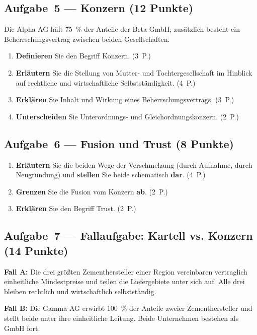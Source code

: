 \documentclass[11pt, a4paper]{article}
\begin{document}
\subsection*{Aufgabe~5 --- Konzern (12 Punkte)}

Die Alpha AG hält 75~\% der Anteile der Beta GmbH; zusätzlich besteht ein
Beherrschungsvertrag zwischen beiden Gesellschaften.

\begin{enumerate}[label=(\alph*)]
  \item \textbf{Definieren} Sie den Begriff Konzern. \hfill (3~P.)
  \item \textbf{Erläutern} Sie die Stellung von Mutter- und Tochtergesellschaft im
    Hinblick auf rechtliche und wirtschaftliche Selbstständigkeit. \hfill (4~P.)
  \item \textbf{Erklären} Sie Inhalt und Wirkung eines Beherrschungsvertrags. \hfill (3~P.)
  \item \textbf{Unterscheiden} Sie Unterordnungs- und Gleichordnungskonzern. \hfill (2~P.)
\end{enumerate}

\subsection*{Aufgabe~6 --- Fusion und Trust (8 Punkte)}

\begin{enumerate}[label=(\alph*)]
  \item \textbf{Erläutern} Sie die beiden Wege der Verschmelzung (durch Aufnahme, durch
    Neugründung) und \textbf{stellen} Sie beide schematisch \textbf{dar}. \hfill (4~P.)
  \item \textbf{Grenzen} Sie die Fusion vom Konzern \textbf{ab}. \hfill (2~P.)
  \item \textbf{Erklären} Sie den Begriff Trust. \hfill (2~P.)
\end{enumerate}

\subsection*{Aufgabe~7 --- Fallaufgabe: Kartell vs. Konzern (14 Punkte)}

\begin{beispiel}[title={Ausgangssituation}]
\textbf{Fall A:} Die drei größten Zementhersteller einer Region vereinbaren vertraglich
einheitliche Mindestpreise und teilen die Liefergebiete unter sich auf. Alle drei bleiben
rechtlich und wirtschaftlich selbstständig.

\textbf{Fall B:} Die Gamma AG erwirbt 100~\% der Anteile zweier Zementhersteller und
stellt beide unter ihre einheitliche Leitung. Beide Unternehmen bestehen als GmbH fort.
\end{beispiel}
\end{document}
